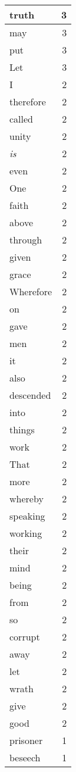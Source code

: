 \begin{center}
\begin{longtable}{l|r}
truth & 3\\ \hline 
may & 3\\ \hline 
put & 3\\ \hline 
Let & 3\\ \hline 
I & 2\\ \hline 
therefore & 2\\ \hline 
called & 2\\ \hline 
unity & 2\\ \hline 
\emph{is} & 2\\ \hline 
even & 2\\ \hline 
One & 2\\ \hline 
faith & 2\\ \hline 
above & 2\\ \hline 
through & 2\\ \hline 
given & 2\\ \hline 
grace & 2\\ \hline 
Wherefore & 2\\ \hline 
on & 2\\ \hline 
gave & 2\\ \hline 
men & 2\\ \hline 
it & 2\\ \hline 
also & 2\\ \hline 
descended & 2\\ \hline 
into & 2\\ \hline 
things & 2\\ \hline 
work & 2\\ \hline 
That & 2\\ \hline 
more & 2\\ \hline 
whereby & 2\\ \hline 
speaking & 2\\ \hline 
working & 2\\ \hline 
their & 2\\ \hline 
mind & 2\\ \hline 
being & 2\\ \hline 
from & 2\\ \hline 
so & 2\\ \hline 
corrupt & 2\\ \hline 
away & 2\\ \hline 
let & 2\\ \hline 
wrath & 2\\ \hline 
give & 2\\ \hline 
good & 2\\ \hline 
prisoner & 1\\ \hline 
beseech & 1\\ \hline 

\end{longtable}
\end{center}
